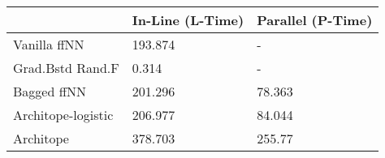 \begin{tabular}{lll}
\toprule
{} & In-Line (L-Time) & Parallel (P-Time) \\
\midrule
Vanilla ffNN       &          193.874 &                 - \\
Grad.Bstd Rand.F   &            0.314 &                 - \\
Bagged ffNN        &          201.296 &            78.363 \\
Architope-logistic &          206.977 &            84.044 \\
Architope          &          378.703 &            255.77 \\
\bottomrule
\end{tabular}
